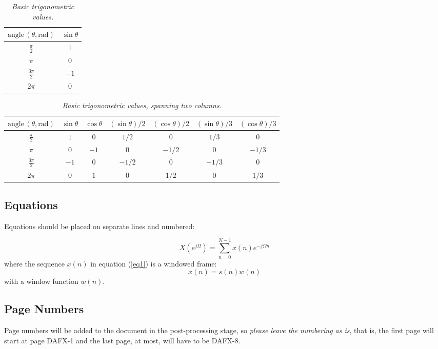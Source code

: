 \documentclass{article}
\begin{document}
\begin{table}[ht]
  \caption{\itshape Basic trigonometric values.}
	\centering
	\begin{tabular}{|c|c|}
		\hline
		$\mathrm{angle}\,(\theta, \mathrm{rad})$ & $\sin \theta$ \\\hline
		$\frac{\pi}{2}$ & $1$ \\
		$\pi$ & $0$ \\
		$\frac{3\pi}{2}$ & $-1$ \\
		$2\pi$ & $0$ \\\hline
	\end{tabular}
	\label{tab:example}
\end{table}

\begin{table}[ht]
  \caption{{\it Basic trigonometric values, spanning two columns.}}
	\centering
  \begin{tabular}{|c|c|c|c|c|c|c|}\hline
    $\mathrm{angle}\, (\theta, \mathrm{rad})$ & $\sin \theta$ & $\cos \theta $ & $(\sin \theta)/2 $ & $(\cos \theta) /2 $ & $(\sin \theta)/3 $ & $(\cos \theta)/3$    \\\hline
    $\frac{\pi}{2}$ & $1$ & $0$ & $1/2$ & $0$ & $1/3$ & $0$ \\
    $\pi$ & $0$ & $-1$ & $0$ & $-1/2$ & $0$ & $-1/3$\\
    $\frac{3\pi}{2}$ & $-1$ & $0$ & $-1/2$ & $0$ & $-1/3$ & $0$ \\
    $2\pi$ & $0$ & $1$ & $0$ & $1/2$ & $0$ & $1/3$ \\\hline
 \end{tabular}
  \label{tab:example2}
\end{table}

\subsection{Equations}
Equations should be placed on separate lines and numbered:

\begin{equation}
	X(e^{j\Omega})=\sum_{n=0}^{N-1}x(n)e^{-j\Omega n}
	\label{eq1}
	\end{equation}
	where the sequence $x(n)$ in equation (\ref{eq1}) is a windowed frame:
	\begin{equation}
	x(n)=s(n) w(n)
	\label{eq2}
\end{equation}
%
with a window function $w(n)$.


\subsection{Page Numbers}
Page numbers will be added to the document in the post-processing stage, so {\em please leave the numbering as is},
that is, the first page will start at page DAFX-1 and the last page, at most, will have to be DAFX-8.
\end{document}
